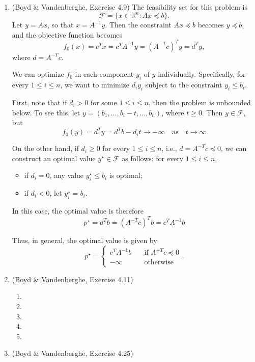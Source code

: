 \documentclass[letterpaper,12pt]{article}
\begin{document}
\begin{enumerate}
\item (Boyd \& Vandenberghe, Exercise 4.9) The feasibility set for
  this problem is
  \begin{equation*}
    \mathcal{F} = \{x \in \mathbb{R}^n : Ax \preceq b\}.
  \end{equation*}
  Let $y = Ax$, so that $x = A^{-1}y$. Then the constraint
  $Ax \preceq b$ becomes $y \preceq b$, and the objective function
  becomes
  \begin{equation*}
    f_0(x) = c^T x = c^T A^{-1} y = (A^{-T} c)^T y = d^T y,
  \end{equation*}
  where $d = A^{-T} c$.

  We can optimize $f_0$ in each component $y_i$ of $y$
  individually. Specifically, for every $1 \leq i \leq n$, we want to
  minimize $d_i y_i$ subject to the constraint $y_i \leq b_i$.

  First, note that if $d_i > 0$ for some $1 \leq i \leq n$, then the
  problem is unbounded below. To see this, let
  $y = (b_1, \ldots, b_i - t, \ldots, b_n)$, where $t \geq 0$. Then
  $y \in \mathcal{F}$, but
  \begin{equation*}
    f_0(y) = d^T y = d^T b - d_i t \to -\infty
      \quad \text{as} \quad t \to \infty
  \end{equation*}

  On the other hand, if $d_i \geq 0$ for every $1 \leq i \leq n$,
  i.e., $d = A^{-T} c \preceq 0$, we can construct an optimal value
  $y^\star \in \mathcal{F}$ as follows: for every $1 \leq i \leq n$,
  \begin{itemize}
  \item if $d_i = 0$, any value $y^\star_i \leq b_i$ is optimal;
  \item if $d_i < 0$, let $y^\star_i = b_i$.
  \end{itemize}
  In this case, the optimal value is therefore
  \begin{equation*}
    p^\star = d^T b = (A^{-T} c)^T b = c^T A^{-1} b
  \end{equation*}

  Thus, in general, the optimal value is given by
  \begin{equation*}
    p^\star = \begin{cases}
      c^T A^{-1} b &\quad \text{if $A^{-T} c \preceq 0$} \\
      -\infty &\quad \text{otherwise}
    \end{cases}.
  \end{equation*}

\item (Boyd \& Vandenberghe, Exercise 4.11)
\begin{enumerate}
\item
\item
\item
\item
\item
\end{enumerate}

\item (Boyd \& Vandenberghe, Exercise 4.25)
\end{enumerate}
\end{document}
